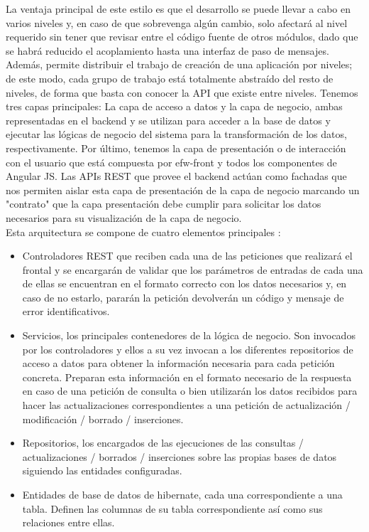 \documentclass[12pt, a4paper, twoside]{book}
\begin{document}
	La ventaja principal de este estilo es que el desarrollo se puede llevar a cabo en varios niveles y, en caso de que sobrevenga algún cambio, solo afectará al nivel requerido sin tener que revisar entre el código fuente de otros módulos, dado que se habrá reducido el acoplamiento hasta una interfaz de paso de mensajes. \cite{Domain Driven Design}\\
	Además, permite distribuir el trabajo de creación de una aplicación por niveles; de este modo, cada grupo de trabajo está totalmente abstraído del resto de niveles, de forma que basta con conocer la API que existe entre niveles. Tenemos tres capas principales: La capa de acceso a datos y la capa de negocio, ambas representadas en el backend y se utilizan para acceder a la base de datos y ejecutar las lógicas de negocio del sistema para la transformación de los datos, respectivamente. Por último, tenemos la capa de presentación o de interacción con el usuario que está compuesta por efw-front y todos los componentes de Angular JS.
	Las APIs REST que provee el backend actúan como fachadas que nos permiten aislar esta capa de presentación de la capa de negocio marcando un "contrato" que la capa presentación debe cumplir para solicitar los datos necesarios para su visualización de la capa de negocio.\\
	
	Esta arquitectura se compone de cuatro elementos principales :
	
	\begin{itemize}
		\item Controladores REST que reciben cada una de las peticiones que realizará el frontal y se encargarán de validar que los parámetros de entradas de cada una de ellas se encuentran en el formato correcto con los datos necesarios y, en caso de no estarlo, pararán la petición devolverán un código y mensaje de error identificativos.
		\item Servicios, los principales contenedores de la lógica de negocio. Son invocados por los controladores y ellos a su vez invocan a los diferentes repositorios de acceso a datos para obtener la información necesaria para cada petición concreta. Preparan esta información en el formato necesario de la respuesta en caso de una petición de consulta o bien utilizarán los datos recibidos para hacer las actualizaciones correspondientes a una petición de actualización / modificación / borrado / inserciones.
		\item Repositorios, los encargados de las ejecuciones de las consultas / actualizaciones / borrados / inserciones sobre las propias bases de datos siguiendo las entidades configuradas.
		\item Entidades de base de datos de hibernate, cada una correspondiente a una tabla. Definen las columnas de su tabla correspondiente así como sus relaciones entre ellas.
	\end{itemize} 
\end{document}
